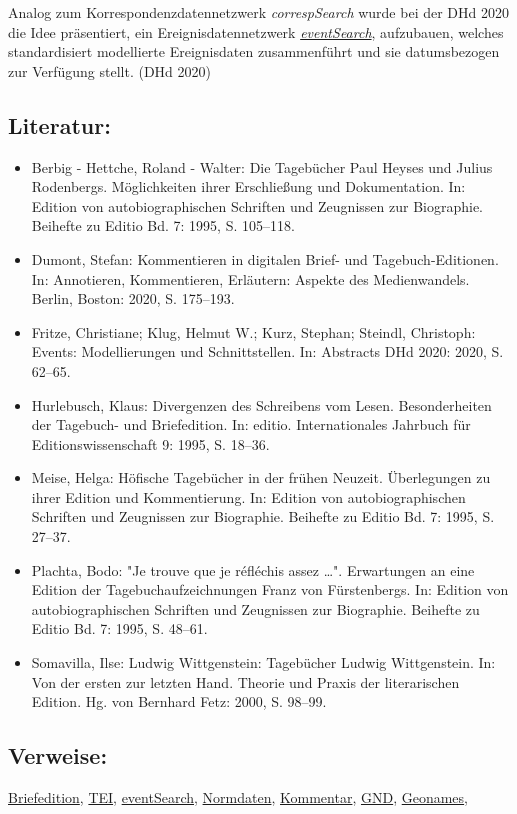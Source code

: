 \documentclass{article}
\begin{document}
        Analog zum Korrespondenzdatennetzwerk \emph{correspSearch} wurde bei der DHd 2020 die Idee präsentiert, ein Ereignisdatennetzwerk \emph{\href{http://gams.uni-graz.at/o:konde.53}{eventSearch}}, aufzubauen, welches standardisiert modellierte Ereignisdaten zusammenführt und sie datumsbezogen zur Verfügung stellt. (DHd 2020)\\
            
        \subsection*{Literatur:}\begin{itemize}\item Berbig - Hettche, Roland - Walter: Die Tagebücher Paul Heyses und Julius Rodenbergs. Möglichkeiten ihrer Erschließung und Dokumentation. In: Edition von autobiographischen Schriften und Zeugnissen zur Biographie. Beihefte zu Editio Bd. 7: 1995, S. 105–118.\item Dumont, Stefan: Kommentieren in digitalen Brief- und Tagebuch-Editionen. In: Annotieren, Kommentieren, Erläutern: Aspekte des Medienwandels. Berlin, Boston: 2020, S. 175–193.\item Fritze, Christiane; Klug, Helmut W.; Kurz, Stephan; Steindl, Christoph: Events: Modellierungen und Schnittstellen. In: Abstracts DHd 2020: 2020, S. 62–65.\item Hurlebusch, Klaus: Divergenzen des Schreibens vom Lesen. Besonderheiten der Tagebuch- und Briefedition. In: editio. Internationales Jahrbuch für Editionswissenschaft 9: 1995, S. 18–36.\item Meise, Helga: Höfische Tagebücher in der frühen Neuzeit. Überlegungen zu ihrer Edition und Kommentierung. In: Edition von autobiographischen Schriften und Zeugnissen zur Biographie. Beihefte zu Editio Bd. 7: 1995, S. 27–37.\item Plachta, Bodo: "Je trouve que je réfléchis assez …". Erwartungen an eine Edition der Tagebuchaufzeichnungen Franz von Fürstenbergs. In: Edition von autobiographischen Schriften und Zeugnissen zur Biographie. Beihefte zu Editio Bd. 7: 1995, S. 48–61.\item Somavilla, Ilse: Ludwig Wittgenstein: Tagebücher Ludwig Wittgenstein. In: Von der ersten zur letzten Hand. Theorie und Praxis der literarischen Edition. Hg. von Bernhard Fetz: 2000, S. 98–99.\end{itemize}\subsection*{Verweise:}\href{https://gams.uni-graz.at/o:konde.39}{Briefedition}, \href{https://gams.uni-graz.at/o:konde.178}{TEI}, \href{https://gams.uni-graz.at/o:konde.53}{eventSearch}, \href{https://gams.uni-graz.at/o:konde.147}{Normdaten}, \href{https://gams.uni-graz.at/o:konde.34}{Kommentar}, \href{https://gams.uni-graz.at/o:konde.109}{GND}, \href{https://gams.uni-graz.at/o:konde.107}{Geonames}, 
\end{document}
